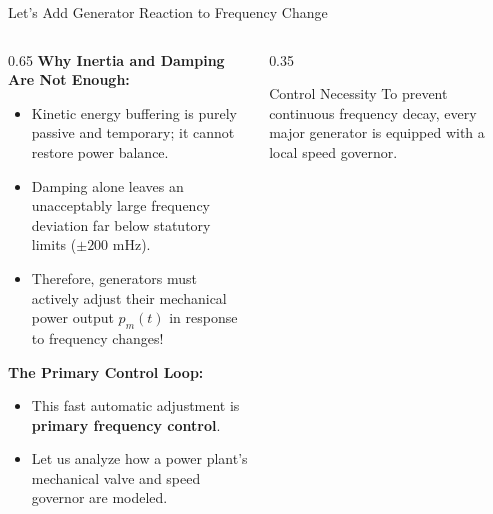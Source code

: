 \begin{frame}{Let's Add Generator Reaction to Frequency Change}
\begin{columns}[T]
\begin{column}{0.65\textwidth}
    \footnotesize
    \textbf{Why Inertia and Damping Are Not Enough:}
    \begin{itemize}\setlength{\itemsep}{3pt}
        \item Kinetic energy buffering is purely passive and temporary; it cannot restore power balance.
        \item Damping alone leaves an unacceptably large frequency deviation far below statutory limits ($\pm 200\text{ mHz}$).
        \item Therefore, generators must actively adjust their mechanical power output $p_m(t)$ in response to frequency changes!
    \end{itemize}
    \vspace{0.2cm}
    \textbf{The Primary Control Loop:}
    \begin{itemize}\setlength{\itemsep}{3pt}
        \item This fast automatic adjustment is \textbf{primary frequency control}.
        \item Let us analyze how a power plant's mechanical valve and speed governor are modeled.
    \end{itemize}
\end{column}
\begin{column}{0.35\textwidth}
    \begin{alertblock}{Control Necessity}
    \scriptsize
    To prevent continuous frequency decay, every major generator is equipped with a local speed governor.
    \end{alertblock}
\end{column}
\end{columns}
\end{frame}

